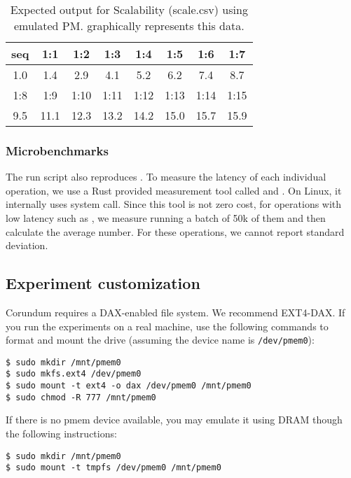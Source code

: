 {\begin{table}[!ht]
  \begin{tabular}{|c|c|c|c|c|c|c|c|} \hline
    seq&1:1&1:2&1:3&1:4&1:5&1:6&1:7\\\hline
    1.0&1.4&2.9&4.1&5.2&6.2&7.4&8.7\\\hline\hline
    1:8&1:9&1:10&1:11&1:12&1:13&1:14&1:15\\\hline
    9.5&11.1&12.3&13.2&14.2&15.0&15.7&15.9\\\hline
  \end{tabular}
  \caption{Expected output for Scalability (scale.csv) using emulated PM.  graphically represents this data.}
  \label{tbl:scale}
\end{table}


\subsubsection{Microbenchmarks}
The run script also reproduces . To measure the latency of each individual operation, we use a Rust provided measurement tool called  and . On Linux, it internally uses  system call. Since this tool is not zero cost, for operations with low latency such as , we measure running a batch of 50k of them and then calculate the average number. For these operations, we cannot report standard deviation.

\subsection{Experiment customization}
\label{sec:custom}

Corundum requires a DAX-enabled file system. We recommend EXT4-DAX. If you run the experiments on a real machine, use the following commands to format and mount the drive (assuming the device name is \verb+/dev/pmem0+):

\begin{verbatim}
$ sudo mkdir /mnt/pmem0
$ sudo mkfs.ext4 /dev/pmem0
$ sudo mount -t ext4 -o dax /dev/pmem0 /mnt/pmem0
$ sudo chmod -R 777 /mnt/pmem0
\end{verbatim}

If there is no pmem device available, you may emulate it using DRAM though the following instructions:

\begin{verbatim}
$ sudo mkdir /mnt/pmem0
$ sudo mount -t tmpfs /dev/pmem0 /mnt/pmem0
\end{verbatim}

}
